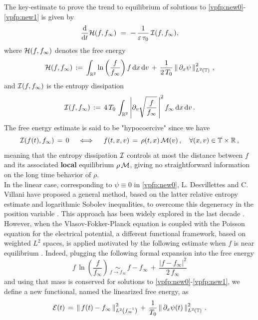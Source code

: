 \documentclass[11pt]{amsart}
\numberwithin{equation}{section}
\numberwithin{figure}{section}
\begin{document}
The key-estimate to prove the trend to equilibrium of solutions to \eqref{vpfp:new0}-\eqref{vpfp:new1} is given by
\begin{equation*}
  \frac{\mathrm{d} }{\mathrm{d} t} {\mathcal H}(f,f_\infty)  \,\,=\,\, - \,\frac{1}{\varepsilon\,\tau_0}
  \,{\mathcal I}(f, f_\infty), 
\end{equation*}
where $ {\mathcal H}(f,f_\infty)$ denotes the free energy
\begin{equation*}
{\mathcal H}(f,f_\infty) \,:=\, \int_{{\mathbb R}^2} \ln{\left(\frac{f}{f_{\infty}}\right)}\,f\,\mathrm{d} x\,\mathrm{d} v\,+\,\frac{1}{2\,T_0}
\left\|\,\partial_x\psi\,\right\|_{L^2\left({\mathbb T}\right)}^2\,,
\end{equation*}
and ${\mathcal I}(f,f_\infty)$ is the entropy dissipation 
\begin{equation*}
{\mathcal I}(f,f_\infty)\,:=\, 4\,T_0\,
\int_{{\mathbb R}^2} \left|
\partial_v
\sqrt{\frac{f}{f_{\infty}}}\,
\right|^2
f_{\infty}\, \mathrm{d} x\,\mathrm{d} v\,.
\end{equation*}
The free energy estimate is said to be "hypocoercive" since we have
\[
{\mathcal I}(f(t),f_\infty)\,=\,0\quad\iff \quad f(t,x,v)\,=\,\rho(t,x)\,{\mathcal M}(v)\,,\quad \forall(x,v)\in{\mathbb T}\times{\mathbb R}\,,
\]
meaning that the entropy dissipation ${\mathcal I}$ controls at most the distance between $f$ and its associated \textbf{local} equilibrium $\rho\,{\mathcal M}$, giving no straightforward information on the long time behavior of $\rho$. \\
In the linear case, corresponding to $\psi\equiv 0$ in \eqref{vpfp:new0}, L. Desvillettes and
C. Villani have proposed a general method, based on the latter
relative entropy estimate and logarithmic Sobolev
inequalities, to overcome this degeneracy in the
position variable \cite{DV:2001}. This
approach has been widely explored in the last decade \cite{Villani:AMS, Dolbeault2015}.
However, when the Vlasov-Fokker-Planck equation is coupled with the
Poisson equation for the electrical potential, a different
functional framework, based on weighted $L^2$ spaces, is applied motivated by the following estimate when $f$ is near
equilibrium \cite{Herau_Thomann16, Herda_Rodrigues}. Indeed, plugging the
following formal expansion into the free energy
\[
f\,\ln{\left(\frac{f}{f_{\infty}}\right)}
\,\underset{f \rightarrow f_{\infty}}{\sim}\,
f-f_{\infty}
\,+\,
\frac{\left|f-f_{\infty}\right|^2}{2\,f_{\infty}}
\]
and using that mass is conserved for solutions to
\eqref{vpfp:new0}-\eqref{vpfp:new1}, we define a new functional, named
the linearized free energy, as
\begin{equation}
  \label{continuous:energy}
{\mathcal E}(t)\,=\,
\left\|\,f(t)-f_{\infty}\,\right\|^2_{L^2\left(f_{\infty}^{-1}\right)}\,+\,
\frac{1}{T_0}
\left\|\,\partial_x\psi(t)\,\right\|^2_{L^2\left({\mathbb T}\right)}\,.
\end{equation}
\end{document}

